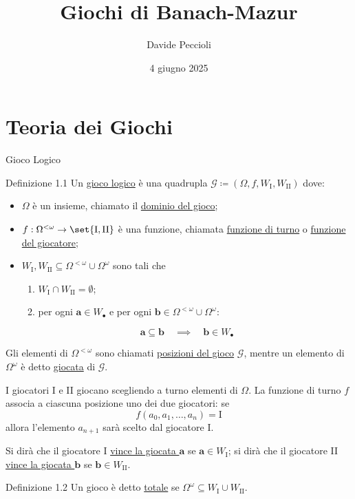 \documentclass[babel]{beamer}
\institute[]{Università degli Studi di Torino}
\author{Davide Peccioli}
\date{4 giugno 2025}
\title{Giochi di Banach-Mazur}
\renewcommand{\href}[2]{#2}
\begin{document}
\maketitle
\section{Teoria dei Giochi}
\label{sec:org2700ea0}

\begin{frame}[label={sec:orgb34398e}]{Gioco Logico}
\begin{block}{Definizione 1.1}
Un \uline{gioco logico} è una quadrupla \(\mathcal{G} \coloneqq (\Omega, f, W_{\text{I}}, W_{\text{II}})\) dove:
\begin{itemize}
\item \(\Omega\) è un \href{../../../../../../../org/roam/20250130104331-insieme_mk.org}{insieme}, chiamato il \uline{dominio del gioco};
\item \(f:\Omega^{<\omega}\to \set{\text{I},\text{II}}\) è una \href{../../../../../../../org/roam/20250202170607-classe_relazione_binaria.org}{funzione}, chiamata \uline{funzione di turno} o \uline{funzione del giocatore};
\item \(W_{\text{I}},W_{\text{II}} \subseteq \Omega^{<\omega}\cup \Omega^{\omega}\) sono tali che
\begin{enumerate}
\item \(W_{\text{I}}\cap W_{\text{II}} = \emptyset\);
\item per ogni \(\bm{a} \in W_{\bullet}\) e per ogni \(\bm{b} \in\Omega^{<\omega}\cup \Omega^{\omega}\):
\end{enumerate}
\begin{equation*}
  \bm{a} \subseteq \bm{b}\quad\implies\quad \bm{b} \in W_{\bullet}
\end{equation*}
\end{itemize}

Gli elementi di \(\Omega^{<\omega}\) sono chiamati \uline{posizioni del gioco} \(\mathcal{G}\), mentre un elemento di \(\Omega^{\omega}\) è detto \uline{giocata} di \(\mathcal{G}\).
\end{block}
\end{frame}
\begin{frame}[label={sec:orgae23e0b}]
I giocatori I e II giocano scegliendo a turno elementi di \(\Omega\). La funzione di turno \(f\) associa a ciascuna posizione uno dei due giocatori: se
\begin{equation*}
f(a_{0},a_{1},\dots,a_{n}) = \text{I}
\end{equation*}
allora l'elemento \(a_{n+1}\) sarà scelto dal giocatore I.

Si dirà che il giocatore I \uline{vince la giocata \(\bm{a}\)} se \(\bm{a} \in W_{\text{I}}\); si dirà che il giocatore II \uline{vince la giocata \(\bm{b}\)} se \(\bm{b} \in W_{\text{II}}\).
\begin{block}{Definizione 1.2}
Un gioco è detto \uline{totale} se \(\Omega^{\omega} \subseteq W_{\text{I}}\cup W_{\text{II}}\).
\end{block}
\end{frame}
\end{document}
